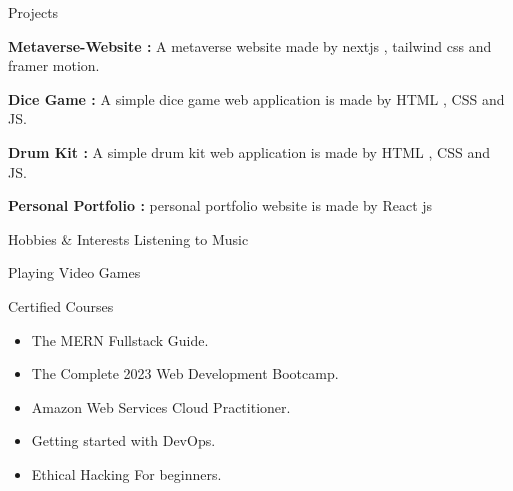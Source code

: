 \documentclass{resume} %
\begin{document}
\begin{rSection}{Projects}
\vspace{-10px}
\item {\textbf{Metaverse-Website :} {A metaverse website made by nextjs , tailwind css and framer motion.}}
\item {\textbf{Dice Game :} {A simple dice game web application is made by HTML , CSS and JS.}}
\item {\textbf{Drum Kit :} {A simple drum kit web application is made by HTML , CSS and JS.}}
\item {\textbf{Personal Portfolio :} {personal portfolio website is made by React js}}
\end{rSection}


\begin{rSection}{Hobbies \& Interests} 
{Listening to Music}\par{Playing Video Games}


\end{rSection}

\begin{rSection}{Certified Courses} 

\begin{itemize}\item The MERN Fullstack Guide.
\end{itemize}
\begin{itemize}\item The Complete 2023 Web Development Bootcamp.
\end{itemize}
\begin{itemize}\item Amazon Web Services Cloud Practitioner.
\end{itemize}
\begin{itemize}\item Getting started with DevOps.
\end{itemize}
\begin{itemize}\item Ethical Hacking For beginners.
\end{itemize}
\end{rSection}
\end{document}
